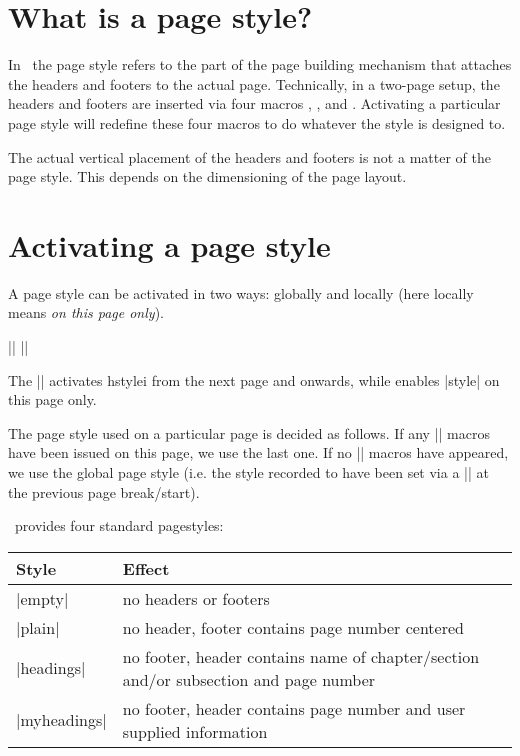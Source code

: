 \section{What is a page style?}

In \latex\ the page style refers to the part of the page building mechanism that
attaches the headers and footers to the actual page. Technically, in a two-page
setup, the headers and footers are inserted via four macros , ,
 and . Activating a particular page style will redefine
these four macros to do whatever the style is designed to.

The actual vertical placement of the headers and footers is not a
matter of the page style. This depends on the dimensioning of the page layout.

\section{Activating a page style}
A page style can be activated in two ways: globally and locally (here locally
means \emph{on this page only}).

{\obeylines
|\pagestyle{<style>}|
|\thispagestyle{<style>}|
}

The |\pagestyle{style}| activates hstylei from the next page and onwards, while  enables |style| on this page only.

The page style used on a particular page is decided as follows. If any |\thispagestyle|
macros have been issued on this page, we use the last one. If no
|\thispagestyle| macros have appeared, we use the global page style (i.e. the style
recorded to have been set via a |\pagestyle| at the previous page break/start).
\medskip


\latex\ provides four standard pagestyles:

\begin{tabular}{lp{5.0cm}}
\toprule
Style & Effect\\
\midrule
|empty| &no headers or footers\\
|plain|    &no header, footer contains page number centered\\
|headings| &no footer, header contains name of chapter/section and/or subsection and page number\\
|myheadings| &no footer, header contains page number and user supplied information\\
\bottomrule
\end{tabular}
\medskip

